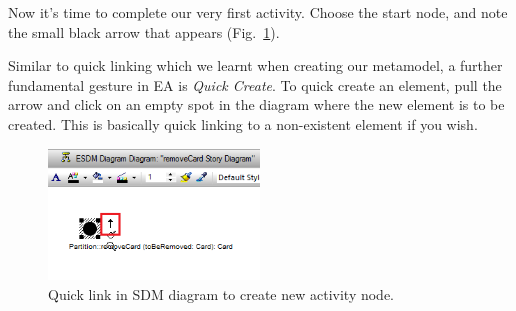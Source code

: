 % 
% 
% 
% 

Now it's time to complete our very first activity. 
Choose the start node, and note the small black arrow that appears (Fig.~\ref{fig:sdm_quicklink}).  

\clearpage
Similar to quick linking which we learnt when creating our metamodel, a further fundamental gesture in EA is \emph{Quick
Create}. 
To quick create an element, pull the arrow and click on an empty spot in the diagram where the new element is to be created.  
This is basically quick linking to a non-existent element if you wish.

\begin{figure}[htp]
\begin{center}
  \includegraphics[width=0.5\textwidth]{pics/sdmBilder/removeCard/sdm03RAW}
  \caption{Quick link in SDM diagram to create new activity node.}  
  \label{fig:sdm_quicklink}
\end{center}
\end{figure}

